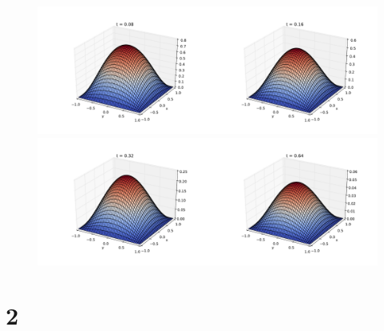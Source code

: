 \documentclass{article}
\begin{document}
\begin{figure}
  \includegraphics[width=0.5\textwidth]{1/t008.pdf}\includegraphics[width=0.5\textwidth]{1/t016.pdf}
  \includegraphics[width=0.5\textwidth]{1/t032.pdf}\includegraphics[width=0.5\textwidth]{1/t064.pdf}
\end{figure}

\clearpage
\section*{2}
\end{document}

